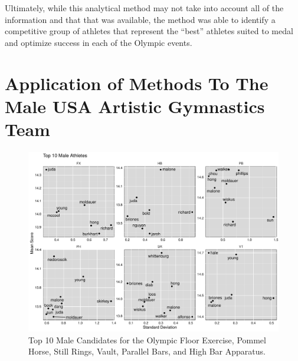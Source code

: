 \documentclass[12pt]{article}
\begin{document}
Ultimately, while this analytical method may not take into account all of the information and that that was available, 
the method was able to identify a competitive group of athletes that represent the ``best'' athletes suited 
to medal and optimize success in each of the Olympic events.


\appendix

\section{Application of Methods To The Male USA Artistic Gymnastics Team}

\begin{figure}
  \centering
  \includegraphics[scale=0.5]{FinalMaleApparatusPlot.pdf}
  \caption{Top 10 Male Candidates for the Olympic Floor Exercise, Pommel Horse, Still Rings, Vault, Parallel Bars, 
  and High Bar Apparatus.}
  \label{fig:MA}
\end{figure}
\end{document}
